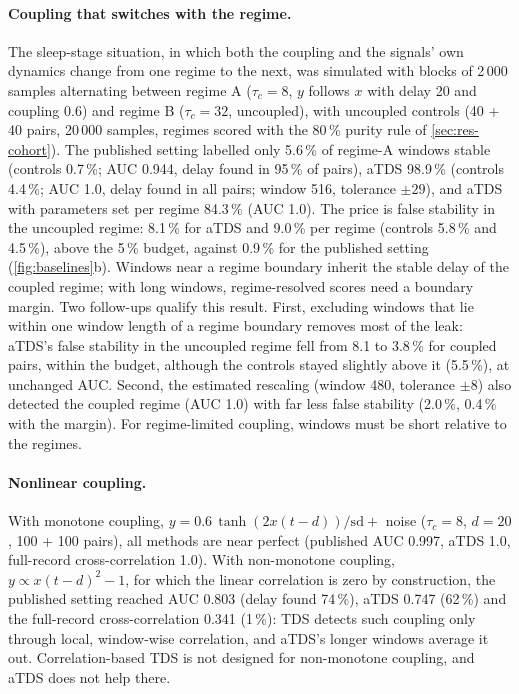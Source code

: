 \documentclass[11pt,a4paper]{article}
\begin{document}
\paragraph{Coupling that switches with the regime.} The sleep-stage situation, in which both the coupling and the signals' own dynamics change from one regime to the next, was simulated with blocks of 2\,000 samples alternating between regime A ($\tau_c = 8$, $y$ follows $x$ with delay 20 and coupling 0.6) and regime B ($\tau_c = 32$, uncoupled), with uncoupled controls (40 + 40 pairs, 20\,000 samples, regimes scored with the 80\,\% purity rule of \cref{sec:res-cohort}). The published setting labelled only 5.6\,\% of regime-A windows stable (controls 0.7\,\%; AUC 0.944, delay found in 95\,\% of pairs), aTDS 98.9\,\% (controls 4.4\,\%; AUC 1.0, delay found in all pairs; window 516, tolerance $\pm29$), and aTDS with parameters set per regime 84.3\,\% (AUC 1.0). The price is false stability in the uncoupled regime: 8.1\,\% for aTDS and 9.0\,\% per regime (controls 5.8\,\% and 4.5\,\%), above the 5\,\% budget, against 0.9\,\% for the published setting (\cref{fig:baselines}b). Windows near a regime boundary inherit the stable delay of the coupled regime; with long windows, regime-resolved scores need a boundary margin. Two follow-ups qualify this result. First, excluding windows that lie within one window length of a regime boundary removes most of the leak: aTDS's false stability in the uncoupled regime fell from 8.1 to 3.8\,\% for coupled pairs, within the budget, although the controls stayed slightly above it (5.5\,\%), at unchanged AUC. Second, the estimated rescaling (window 480, tolerance $\pm8$) also detected the coupled regime (AUC 1.0) with far less false stability (2.0\,\%, 0.4\,\% with the margin). For regime-limited coupling, windows must be short relative to the regimes.

\paragraph{Nonlinear coupling.} With monotone coupling, $y = 0.6\,\tanh(2x(t-d))/\mathrm{sd} + $ noise ($\tau_c = 8$, $d = 20$, 100 + 100 pairs), all methods are near perfect (published AUC 0.997, aTDS 1.0, full-record cross-correlation 1.0). With non-monotone coupling, $y \propto x(t-d)^2 - 1$, for which the linear correlation is zero by construction, the published setting reached AUC 0.803 (delay found 74\,\%), aTDS 0.747 (62\,\%) and the full-record cross-correlation 0.341 (1\,\%): TDS detects such coupling only through local, window-wise correlation, and aTDS's longer windows average it out. Correlation-based TDS is not designed for non-monotone coupling, and aTDS does not help there.
\end{document}
